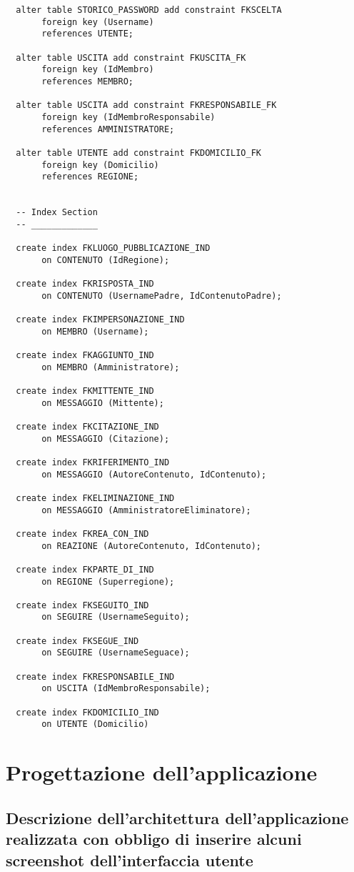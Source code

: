 \documentclass[a4paper,12pt]{report}
\begin{document}
\begin{lstlisting}
  alter table STORICO_PASSWORD add constraint FKSCELTA
       foreign key (Username)
       references UTENTE;
  
  alter table USCITA add constraint FKUSCITA_FK
       foreign key (IdMembro)
       references MEMBRO;
  
  alter table USCITA add constraint FKRESPONSABILE_FK
       foreign key (IdMembroResponsabile)
       references AMMINISTRATORE;
  
  alter table UTENTE add constraint FKDOMICILIO_FK
       foreign key (Domicilio)
       references REGIONE;
  
  
  -- Index Section
  -- _____________ 
  
  create index FKLUOGO_PUBBLICAZIONE_IND
       on CONTENUTO (IdRegione);
  
  create index FKRISPOSTA_IND
       on CONTENUTO (UsernamePadre, IdContenutoPadre);
  
  create index FKIMPERSONAZIONE_IND
       on MEMBRO (Username);
  
  create index FKAGGIUNTO_IND
       on MEMBRO (Amministratore);
  
  create index FKMITTENTE_IND
       on MESSAGGIO (Mittente);
  
  create index FKCITAZIONE_IND
       on MESSAGGIO (Citazione);
  
  create index FKRIFERIMENTO_IND
       on MESSAGGIO (AutoreContenuto, IdContenuto);
  
  create index FKELIMINAZIONE_IND
       on MESSAGGIO (AmministratoreEliminatore);
  
  create index FKREA_CON_IND
       on REAZIONE (AutoreContenuto, IdContenuto);
  
  create index FKPARTE_DI_IND
       on REGIONE (Superregione);
  
  create index FKSEGUITO_IND
       on SEGUIRE (UsernameSeguito);
  
  create index FKSEGUE_IND
       on SEGUIRE (UsernameSeguace);
  
  create index FKRESPONSABILE_IND
       on USCITA (IdMembroResponsabile);
  
  create index FKDOMICILIO_IND
       on UTENTE (Domicilio)
\end{lstlisting}
\chapter{Progettazione dell'applicazione}
\section{Descrizione dell'architettura dell'applicazione realizzata con obbligo di inserire alcuni screenshot dell'interfaccia utente}
\end{document}
